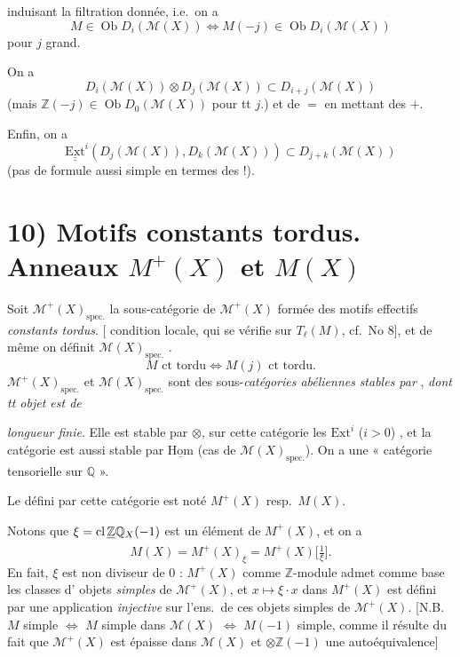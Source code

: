 \documentclass[11pt,a4paper]{article}
\begin{document}
induisant la filtration donnée, \struck{\ill{}} i.e.\ on a
\[
  M \in \operatorname{Ob} D_{i}(\mathcal{M}(X)) \Longleftrightarrow
  M(-j) \in \operatorname{Ob} D_{i}(\mathcal{M}(X))
\]
pour $j$ grand.

On a
\[
  D_{i}(\mathcal{M}(X)) \otimes D_{j}(\mathcal{M}(X)) \subset D_{i+j}(\mathcal{M}(X))
\]
(mais $\mathbb{Z}(-j) \in \operatorname{Ob} D_{0}(\mathcal{M}(X))$ pour tt $j$.)
et de $=$ en mettant des $+$.

Enfin, on a
\[
  \underline{\underline{\mathrm{Ext}}}^{i}(D_{j}(\mathcal{M}(X)), D_{k}(\mathcal{M}(X))) \subset D_{j+k}(\mathcal{M}(X))
\]
(pas de formule aussi simple en termes des  !).

\section{10) Motifs constants tordus. Anneaux $M^{+}(X)$ et $M(X)$}

Soit $\mathcal{M}^{+}(X)_{\mathrm{spec.}}$ la sous-catégorie de
$\mathcal{M}^{+}(X)$ formée des motifs effectifs \emph{constants tordus}.
[ condition locale, qui se vérifie sur $T_{\ell}(M)$,
cf.\ No 8], et de même on définit $\mathcal{M}(X)_{\mathrm{spec.}}$
. 
\[
  M \text{ ct tordu} \Longleftrightarrow M(j) \text{ ct tordu.}
\]
$\mathcal{M}^{+}(X)_{\mathrm{spec.}}$ et $\mathcal{M}(X)_{\mathrm{spec.}}$
sont des sous-\emph{catégories abéliennes} \emph{stables par}
, \emph{dont tt objet est de}

\emph{longueur finie}. Elle est stable par $\otimes$, sur cette catégorie
les $\mathrm{Ext}^{i}$ ($i > 0$) , et la catégorie est
aussi stable par $\underline{\mathrm{Hom}}$ (cas de
$\mathcal{M}(X)_{\mathrm{spec.}}$). On a une « catégorie tensorielle sur
$\mathbb{Q}$ ».

Le  défini par cette catégorie est noté $M^{+}(X)$
resp.\ $M(X)$.

Notons que $\xi = \mathrm{cl}\, \struck{\mathbb{Z}}\mathbb{Q}_{X}(-1)$ est un
élément de $M^{+}(X)$, et on a
\[
  M(X) = M^{+}(X)_{\xi} = M^{+}(X)\bigl[\tfrac{1}{\xi}\bigr] .
\]
En fait, $\xi$ est non diviseur de $0$ : $M^{+}(X)$ comme $\mathbb{Z}$-module
admet comme base les classes d'\struck{\ill{}} objets
\emph{simples} de $\mathcal{M}^{+}(X)$, et $x \mapsto \xi \cdot x$ dans
$M^{+}(X)$ est défini par une application \emph{injective} sur l'ens.\ de ces objets
simples de $\mathcal{M}^{+}(X)$. [N.B. $M$ simple $\Longleftrightarrow$ $M$
simple dans $\mathcal{M}(X)$ $\Longleftrightarrow$ $M(-1)$ simple, comme il
résulte du fait que $\mathcal{M}^{+}(X)$ est épaisse dans $\mathcal{M}(X)$ et
$\otimes \mathbb{Z}(-1)$ une autoéquivalence]
\end{document}
